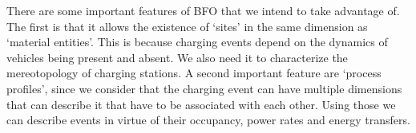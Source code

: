 There are some important features of BFO that we intend to take advantage of.
The first is that it allows the existence of `sites' in the same dimension as
`material entities'. This is because charging events depend on the dynamics of
vehicles being present and absent. We also need it to characterize the
mereotopology of charging stations. A second important feature are `process
profiles', since we consider that the charging event can have multiple
dimensions that can describe it that have to be associated with each other.
Using those we can describe events in virtue of their occupancy, power rates
and energy transfers.
